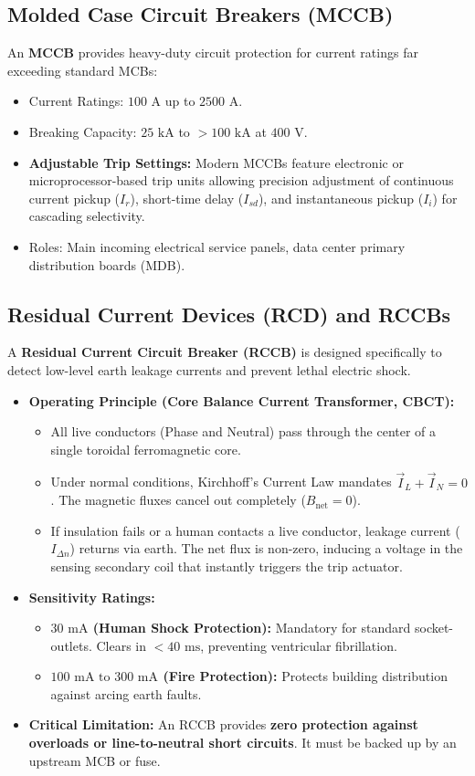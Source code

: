 \subsection{Molded Case Circuit Breakers (MCCB)}
An \textbf{MCCB} provides heavy-duty circuit protection for current ratings far exceeding standard MCBs:
\begin{itemize}
    \item Current Ratings: $100\text{ A}$ up to $2500\text{ A}$.
    \item Breaking Capacity: $25\text{ kA}$ to $>100\text{ kA}$ at $400\text{ V}$.
    \item \textbf{Adjustable Trip Settings:} Modern MCCBs feature electronic or microprocessor-based trip units allowing precision adjustment of continuous current pickup ($I_r$), short-time delay ($I_{sd}$), and instantaneous pickup ($I_i$) for cascading selectivity.
    \item Roles: Main incoming electrical service panels, data center primary distribution boards (MDB).
\end{itemize}

\subsection{Residual Current Devices (RCD) and RCCBs}
A \textbf{Residual Current Circuit Breaker (RCCB)} is designed specifically to detect low-level earth leakage currents and prevent lethal electric shock.
\begin{itemize}
    \item \textbf{Operating Principle (Core Balance Current Transformer, CBCT):}
    \begin{itemize}
        \item All live conductors (Phase and Neutral) pass through the center of a single toroidal ferromagnetic core.
        \item Under normal conditions, Kirchhoff's Current Law mandates $\vec{I}_L + \vec{I}_N = 0$. The magnetic fluxes cancel out completely ($B_{\text{net}} = 0$).
        \item If insulation fails or a human contacts a live conductor, leakage current ($I_{\Delta n}$) returns via earth. The net flux is non-zero, inducing a voltage in the sensing secondary coil that instantly triggers the trip actuator.
    \end{itemize}
    \item \textbf{Sensitivity Ratings:}
    \begin{itemize}
        \item \textbf{$30\text{ mA}$ (Human Shock Protection):} Mandatory for standard socket-outlets. Clears in $<40\text{ ms}$, preventing ventricular fibrillation.
        \item \textbf{$100\text{ mA} \text{ to } 300\text{ mA}$ (Fire Protection):} Protects building distribution against arcing earth faults.
    \end{itemize}
    \item \textbf{Critical Limitation:} An RCCB provides \textbf{zero protection against overloads or line-to-neutral short circuits}. It must be backed up by an upstream MCB or fuse.
\end{itemize}

